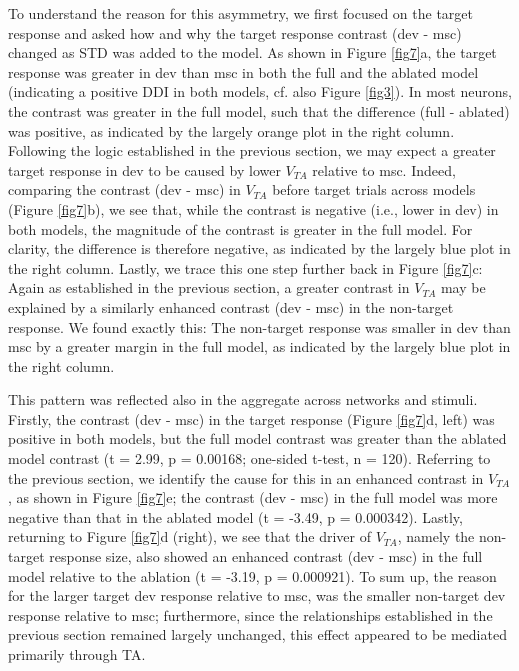 \documentclass[pdflatex,referee,iicol,sn-basic]{sn-jnl}
\theoremstyle{thmstyleone}%
\theoremstyle{thmstyletwo}%
\theoremstyle{thmstylethree}%
\begin{document}
To understand the reason for this asymmetry, we first focused on the target response and asked how and why the target response contrast (dev - msc) changed as STD was added to the model. As shown in Figure \ref{fig7}a, the target response was greater in dev than msc in both the full and the ablated model (indicating a positive DDI in both models, cf. also Figure \ref{fig3}). In most neurons, the contrast was greater in the full model, such that the difference (full - ablated) was positive, as indicated by the largely orange plot in the right column.
Following the logic established in the previous section, we may expect a greater target response in dev to be caused by lower $V_{TA}$ relative to msc. Indeed, comparing the contrast (dev - msc) in $V_{TA}$ before target trials across models (Figure \ref{fig7}b), we see that, while the contrast is negative (i.e., lower in dev) in both models, the magnitude of the contrast is greater in the full model. For clarity, the difference is therefore negative, as indicated by the largely blue plot in the right column.
Lastly, we trace this one step further back in Figure \ref{fig7}c: Again as established in the previous section, a greater contrast in $V_{TA}$ may be explained by a similarly enhanced contrast (dev - msc) in the non-target response. We found exactly this: The non-target response was smaller in dev than msc by a greater margin in the full model, as indicated by the largely blue plot in the right column.

This pattern was reflected also in the aggregate across networks and stimuli. Firstly, the contrast (dev - msc) in the target response (Figure \ref{fig7}d, left) was positive in both models, but the full model contrast was greater than the ablated model contrast (t = 2.99, p = 0.00168; one-sided t-test, n = 120). Referring to the previous section, we identify the cause for this in an enhanced contrast in $V_{TA}$, as shown in Figure \ref{fig7}e; the contrast (dev - msc) in the full model was more negative than that in the ablated model (t = -3.49, p = 0.000342). Lastly, returning to Figure \ref{fig7}d (right), we see that the driver of $V_{TA}$, namely the non-target response size, also showed an enhanced contrast (dev - msc) in the full model relative to the ablation (t = -3.19, p = 0.000921). To sum up, the reason for the larger target dev response relative to msc, was the smaller non-target dev response relative to msc; furthermore, since the relationships established in the previous section remained largely unchanged, this effect appeared to be mediated primarily through TA.
\end{document}
